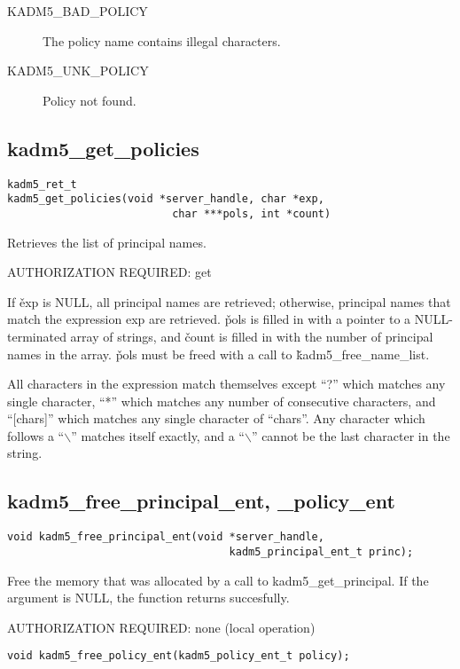 \begin{description}
\item[KADM5_BAD_POLICY] The policy name contains illegal characters.
\item[KADM5_UNK_POLICY] Policy not found.
\end{description}

\subsection{kadm5_get_policies}

\begin{verbatim}
kadm5_ret_t
kadm5_get_policies(void *server_handle, char *exp,
                          char ***pols, int *count)
\end{verbatim}

Retrieves the list of principal names.  

AUTHORIZATION REQUIRED: get

If \v{exp} is NULL, all principal names are retrieved; otherwise,
principal names that match the expression exp are retrieved.  \v{pols}
is filled in with a pointer to a NULL-terminated array of strings, and
\v{count} is filled in with the number of principal names in the
array.  \v{pols} must be freed with a call to
\v{kadm5_free_name_list}.

All characters in the expression match themselves except ``?'' which
matches any single character, ``*'' which matches any number of
consecutive characters, and ``[chars]'' which matches any single
character of ``chars''. Any character which follows a ``$\backslash$''
matches itself exactly, and a ``$\backslash$'' cannot be the last
character in the string.

\subsection{kadm5_free_principal_ent, _policy_ent}

\begin{verbatim}
void kadm5_free_principal_ent(void *server_handle,
                                   kadm5_principal_ent_t princ);
\end{verbatim}

Free the memory that was allocated by a call to
kadm5_get_principal.  If the argument is NULL, the function
returns succesfully.

AUTHORIZATION REQUIRED: none (local operation)

\begin{verbatim}
void kadm5_free_policy_ent(kadm5_policy_ent_t policy);
\end{verbatim}

